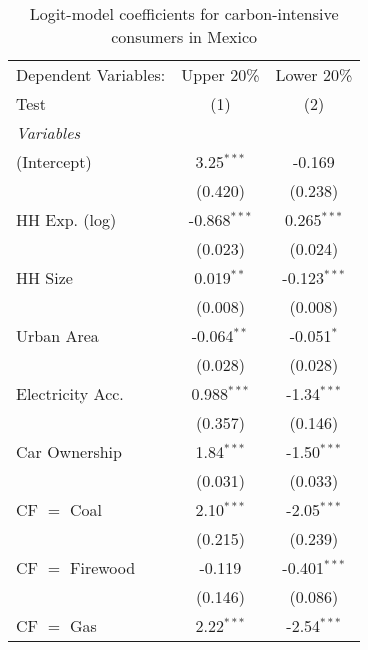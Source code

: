 
\begin{table}[htbp!]
   \centering
   \small
   \begin{adjustbox}{width = 1\textwidth, max height = 0.95\textheight, center}
      \begin{threeparttable}[b]
         \caption{\label{tab:Logit_1_MEX} Logit-model coefficients for carbon-intensive consumers in Mexico}
         \begin{tabular}{lcc}
            \tabularnewline \midrule \midrule
            Dependent Variables: & Upper 20\%     & Lower 20\%\\   
            Test                 & (1)            & (2)\\  
            \midrule
            \emph{Variables}\\
            (Intercept)          & 3.25$^{***}$   & -0.169\\   
                                 & (0.420)        & (0.238)\\   
            HH Exp. (log)        & -0.868$^{***}$ & 0.265$^{***}$\\   
                                 & (0.023)        & (0.024)\\   
            HH Size              & 0.019$^{**}$   & -0.123$^{***}$\\   
                                 & (0.008)        & (0.008)\\   
            Urban Area           & -0.064$^{**}$  & -0.051$^{*}$\\   
                                 & (0.028)        & (0.028)\\   
            Electricity Acc.     & 0.988$^{***}$  & -1.34$^{***}$\\   
                                 & (0.357)        & (0.146)\\   
            Car Ownership        & 1.84$^{***}$   & -1.50$^{***}$\\   
                                 & (0.031)        & (0.033)\\   
            CF $=$ Coal          & 2.10$^{***}$   & -2.05$^{***}$\\   
                                 & (0.215)        & (0.239)\\   
            CF $=$ Firewood      & -0.119         & -0.401$^{***}$\\   
                                 & (0.146)        & (0.086)\\   
            CF $=$ Gas           & 2.22$^{***}$   & -2.54$^{***}$\\   

\end{tabular}
\end{threeparttable}
\end{adjustbox}
\end{table}
